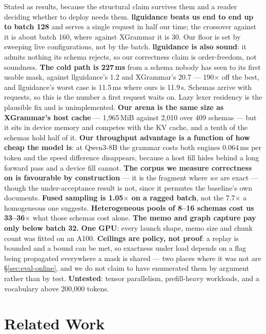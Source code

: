 \documentclass{article}
\begin{document}
Stated as results, because the structural claim survives them and a reader
deciding whether to deploy needs them. \textbf{llguidance beats us end to end up to
batch 128} and serves a single request in half our time; the crossover against
it is about batch 160, where against XGrammar it is 30. Our floor is set by
sweeping live configurations, not by the batch. \textbf{llguidance is also
sound}: it admits nothing its schema rejects, so our correctness claim is
order-freedom, not soundness. \textbf{The cold path is 227\,ms} from a schema
nobody has seen to its first usable mask, against llguidance's 1.2 and
XGrammar's 20.7 --- 190$\times$ off the best, and llguidance's worst case is
11.5\,ms where ours is 11.9\,s. Schemas arrive with requests, so this is the
number a first request waits on. Lazy lexer residency is the plausible fix and is
unimplemented. \textbf{Our arena is the same size as XGrammar's host cache} --- 1{,}965\,MiB
against 2{,}010 over 409 schemas --- but it sits in device memory and competes
with the KV cache, and a tenth of the schemas hold half of it.
\textbf{Our throughput advantage is a function of how cheap the model is}: at
Qwen3-8B the grammar costs both engines 0.064\,ms per token and the speed
difference disappears, because a host fill hides behind a long forward pass and
a device fill cannot. \textbf{The corpus we measure correctness on is
favourable by construction} --- it is the fragment where \emph{we} are exact
--- though the under-acceptance result is not, since it permutes the baseline's
own documents. \textbf{Fused sampling is
1.05$\times$ on a ragged batch}, not the 7.7$\times$ a homogeneous one
suggests. \textbf{Heterogeneous pools of 8--16 schemas cost us
33--36$\times$} what those schemas cost alone. \textbf{The memo and graph
capture pay only below batch 32.} \textbf{One GPU}: every launch shape, memo
size and chunk count was fitted on an A100. \textbf{Ceilings are policy, not
proof}: a replay is bounded and a bound can be met, so exactness under load
depends on a flag being propagated everywhere a mask is shared --- two places
where it was not are \S\ref{sec:eval-online}, and we do not claim to have
enumerated them by argument rather than by test. \textbf{Untested}: tensor
parallelism, prefill-heavy workloads, and a vocabulary above 200{,}000 tokens.

\section{Related Work}
\label{sec:related}
\end{document}
